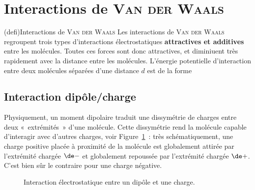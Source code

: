 \documentclass[../../main/main.tex]{subfiles}
\begin{document}
\section{Interactions de \textsc{Van der Waals}}

\begin{tcb*}(defi){Interactions de \textsc{Van der Waals}}
	Les interactions de \textsc{Van der Waals} regroupent trois types d'interactions
	électrostatiques \textbf{attractives et additives} entre les molécules. Toutes
	ces forces sont donc attractives, et diminiuent très rapidement avec la distance
	entre les molécules. L'énergie potentielle d'interaction entre deux molécules
	séparées d'une distance $d$ est de la forme
	\psw{
		\[\boxed{\Ec_{p,VdW} = -\frac{\cte}{d^6}}\]
	}
	\vspace{-15pt}
\end{tcb*}

\subsection{Interaction dipôle/charge}

Physiquement, un moment dipolaire traduit une dissymétrie de charges entre deux
«~extrémités~» d'une molécule. Cette dissymétrie rend la molécule capable
d'interagir avec d'autres charges, voir Figure~\ref{fig:dipq}~: très
schématiquement, une charge positive placée à proximité de la molécule est
globalement attirée par l'extrémité chargée $\de-$ et globalement repoussée par
l'extrémité chargée $\de+$. C'est bien sûr le contraire pour une charge
négative.

\begin{figure}[H]
	\centering
	\caption{Interaction électrostatique entre un dipôle et une charge.}
	\label{fig:dipq}
\end{figure}
\end{document}
